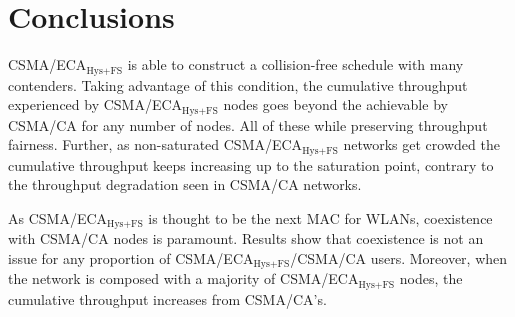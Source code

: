 \documentclass[a4paper,journal]{IEEEtran}
\begin{document}
\label{relatedWork}
\label{introProtocol}
\label{simulations}		
\label{results}
\label{EDCA}
\label{ECAtoCA}


\section{Conclusions}\label{conclusions}
CSMA/ECA$_{\text{Hys+FS}}$ is able to construct a collision-free schedule with many contenders. Taking advantage of this condition, the cumulative throughput experienced by CSMA/ECA$_{\text{Hys+FS}}$ nodes goes beyond the achievable by CSMA/CA for any number of nodes. All of these while preserving throughput fairness. Further, as non-saturated CSMA/ECA$_{\text{Hys+FS}}$ networks get crowded the cumulative throughput keeps increasing up to the saturation point, contrary to the throughput degradation seen in CSMA/CA networks.

As CSMA/ECA$_{\text{Hys+FS}}$ is thought to be the next MAC for WLANs, coexistence with CSMA/CA nodes is paramount. Results show that coexistence is not an issue for any proportion of CSMA/ECA$_{\text{Hys+FS}}$/CSMA/CA users. Moreover, when the network is composed with a majority of CSMA/ECA$_{\text{Hys+FS}}$ nodes, the cumulative throughput increases from CSMA/CA's.




\end{document}
